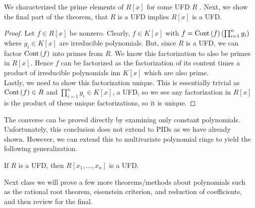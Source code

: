 \begin{recall}
	We characterized the prime elements of \(R\left[ x \right] \) for some UFD \(R\) . Next, we show the final part of the theorem, that \(R\) is a UFD implies \(R\left[ x \right] \) is a UFD.
\end{recall}
\begin{proof}
	Let \(f \in R\left[ x \right] \) be nonzero. Clearly, \(f \in K\left[ x \right] \) with \(f = \operatorname{Cont}\left( f \right) \left( \prod_{i= 1}^{n} g_{i}  \right) \) where \(g_{i} \in K\left[ x \right] \) are irreducible polynomials. But, since \(R\) is a UFD, we can factor \(\operatorname{Cont}\left( f \right) \) into primes from \(R\). We know this factorization to also be primes in \(R\left[ x \right] \). Hence \(f\) can be factorized as the factorization of its content times a product of irreducible polynomials inn \(K\left[ x \right] \) which are also prime.\\
	Lastly, we need to show this factorization unique. This is essentially trivial as \(\operatorname{Cont}\left( f \right) \in R\) and \(\prod_{i= 1}^{n} g_{i} \in K\left[ x \right]  \), a UFD, so we see any factorization in \(R\left[ x \right] \) is the product of these unique factorizations, so it is unique.
\end{proof}
The converse can be proved directly by examining only constant polynomials.\\
Unfortunately, this conclusion does not extend to PIDs as we have already shown. However, we can extend this to multivariate polynomial rings to yield the following generalization.
\begin{corollary}
	If \(R\) is a UFD, then \(R\left[ x_1, \ldots, x_{n} \right] \) is a UFD.
\end{corollary}

Next class we will prove a few more theorems/methods about polynomials such as the rational root theorem, eisenstein criterion, and reduction of coefficients, and then review for the final.
